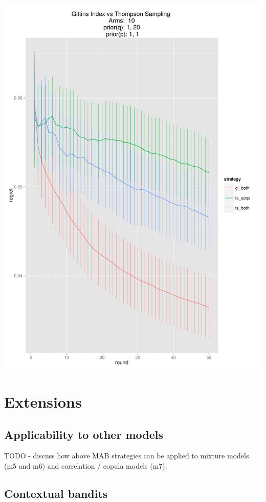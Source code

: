 \documentclass[11pt,a4,singlespacing,titlepagenumber=on]{scrreprt}
\numberwithin{equation}{chapter} %
\theoremstyle{remark}
\begin{document}
\includegraphics[scale=0.7]{GIBoth.pdf}


\chapter{Extensions}

\section{Applicability to other models}

TODO - discuss how above MAB strategies can be applied to mixture models (m5 and m6) and correlation / copula models (m7).

\section{Contextual bandits}
\end{document}
